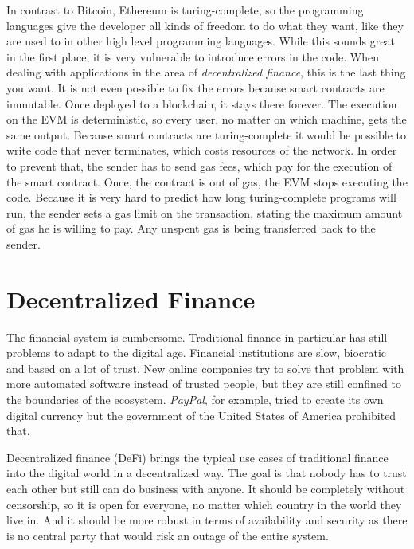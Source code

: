 In contrast to Bitcoin, Ethereum is turing-complete, so the programming languages
give the developer all kinds of freedom to do what they want, like they are used to in other high level programming languages. While this sounds great in the first
place, it is very vulnerable to introduce errors in the code. When dealing with applications in the area of \textit{decentralized finance}, this is the last thing you want.
It is not even possible to fix the errors because smart contracts are immutable. Once deployed to a blockchain, it stays there forever. The execution on the EVM
is deterministic, so every user, no matter on which machine, gets the same output. Because smart contracts are turing-complete it would be possible to write code
that never terminates, which costs resources of the network. In order to prevent that, the sender has to send gas fees, which pay for the execution of the smart
contract. Once, the contract is out of gas, the EVM stops executing the code. Because it is very hard to predict how long turing-complete programs will run, the sender
sets a gas limit on the transaction, stating the maximum amount of gas he is willing to pay. Any unspent gas is being transferred back to the sender.

\section{Decentralized Finance}
The financial system is cumbersome. Traditional finance in particular has still problems to adapt to the digital age. Financial institutions are slow, biocratic
and based on a lot of trust. New online companies try to solve that problem with more automated software instead of trusted people, but they are still confined
to the boundaries of the ecosystem. \textit{PayPal}, for example, tried to create its own digital currency but the government of the United States of America prohibited that.

Decentralized finance (DeFi) brings the typical use cases of traditional finance into the digital world in a decentralized way. The goal is that nobody has to trust each
other but still can do business with anyone. It should be completely without censorship, so it is open for everyone, no matter which country in the world they live
in. And it should be more robust in terms of availability and security as there is no central party that would risk an outage of the entire system.

